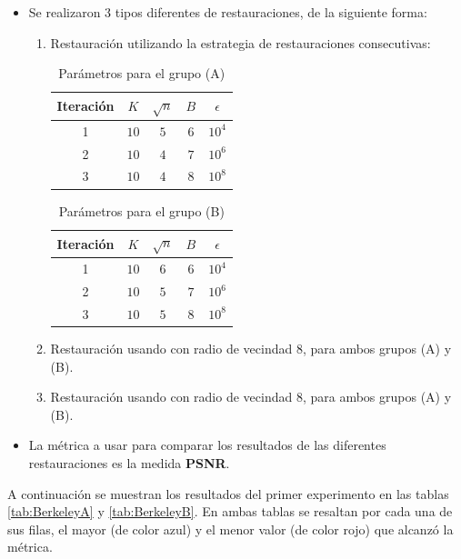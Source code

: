 \begin{itemize}
	\item Se realizaron 3 tipos diferentes de restauraciones, de la siguiente forma:
	\begin{enumerate}
		\item Restauraci\'on \SOP utilizando la estrategia de restauraciones consecutivas:
		\begin{table}[H]
			\centering
			\begin{tabular}{|c|cccc|}
				\hline
				Iteraci\'on & $K$ & $\sqrt{n}$ & $B$ & $\epsilon$ \\\hline
				1 & $10$ & $5$ & $6$ & $10^4$\\
				2 & $10$ & $4$ & $7$ & $10^6$\\
				3 & $10$ & $4$ & $8$ & $10^8$\\\hline
			\end{tabular}
			\caption{Par\'ametros para el grupo (A)}
		\end{table}
		\begin{table}[H]
			\centering
			\begin{tabular}{|c|cccc|}
				\hline
				Iteraci\'on & $K$ & $\sqrt{n}$ & $B$ & $\epsilon$ \\\hline
				1 & $10$ & $6$ & $6$ & $10^4$\\
				2 & $10$ & $5$ & $7$ & $10^6$\\
				3 & $10$ & $5$ & $8$ & $10^8$\\\hline
			\end{tabular}
			\caption{Par\'ametros para el grupo (B)}
		\end{table}
		\item Restauraci\'on usando \TELEA con radio de vecindad $8$, para ambos grupos (A) y (B).
		\item Restauraci\'on usando \NS con radio de vecindad $8$, para ambos grupos (A) y (B).
	\end{enumerate}
	\item La m\'etrica a usar para comparar los resultados de las diferentes restauraciones es la medida \textbf{PSNR}.
\end{itemize}



A continuaci\'on se muestran los resultados del primer experimento en las tablas \ref{tab:BerkeleyA} y \ref{tab:BerkeleyB}. En ambas tablas se resaltan por cada una de sus filas, el mayor (de color azul) y el menor valor (de color rojo) que alcanz\'o la m\'etrica.

